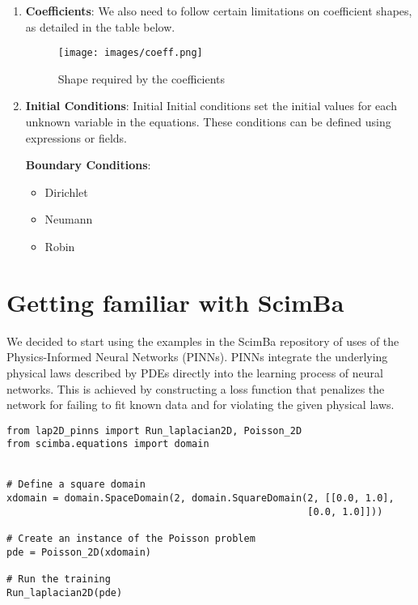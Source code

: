 \documentclass[12pt]{article}
\begin{document}
\begin{enumerate}
    \item \textbf{Coefficients}: We also need to follow certain limitations on coefficient shapes, as detailed in the table below.
    \begin{figure}[H]
    \centering
    \texttt{[image: images/coeff.png]}
    \caption{Shape required by the coefficients}
    \end{figure}
    
    \item \textbf{Initial Conditions}: Initial Initial conditions set the initial values for each unknown variable in the equations. These conditions can be defined using expressions or fields.
    
    \textbf{ Boundary Conditions}: 
    \begin{itemize}
        \item Dirichlet
        \item Neumann
        \item Robin
    \end{itemize}
    
 
\end{enumerate}



\newpage

\section{Getting familiar with ScimBa}

We decided to start using the examples in the ScimBa repository of uses of the Physics-Informed Neural Networks (PINNs). PINNs integrate the underlying physical laws described by PDEs directly into the learning process of neural networks. This is achieved by constructing a loss function that penalizes the network for failing to fit known data and for violating the given physical laws.

\begin{lstlisting}
from lap2D_pinns import Run_laplacian2D, Poisson_2D
from scimba.equations import domain


# Define a square domain
xdomain = domain.SpaceDomain(2, domain.SquareDomain(2, [[0.0, 1.0], 
                                                    [0.0, 1.0]]))

# Create an instance of the Poisson problem
pde = Poisson_2D(xdomain)

# Run the training
Run_laplacian2D(pde)

\end{lstlisting}
\end{document}
